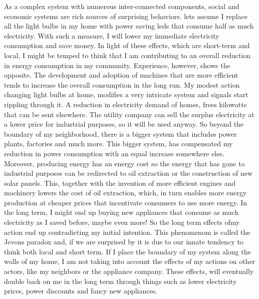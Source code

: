 \documentclass[12pt]{article}
\begin{document}
As a complex system with numerous inter-connected components, social and economic systems are  rich sources of surprising behaviors. lets assume I replace all the light bulbs in my home with power saving leds that consume half as much electricity. With such a measure, I will  lower my immediate electricity consumption and save money. In light of these effects, which are short-term and local, I might be temped to think that I am contributing to an overall reduction in energy consumption in my community. Experience, however, shows the opposite. The development and adoption of machines that are more efficient tends to increase the overall consumption in the long run. My modest action changing light bulbs at home, modifies a very intricate system and signals start rippling through it. A reduction in electricity demand of homes, frees kilowatts that can be sent elsewhere. The utility company can sell the surplus electricity at a lower price for industrial purposes, so it will be used anyway. So beyond the boundary of my neighborhood, there is a bigger system that includes power plants, factories and much more. This bigger system, has compensated my reduction in power consumption with an equal increase somewhere else. Moreover, producing energy has an energy cost so the energy that has gone to industrial purposes can be redirected to oil extraction or the construction of new solar panels. This, together with the invention of more efficient engines and machinery lowers the cost of oil extraction, which, in turn enables more energy production at cheaper prices that incentivate consumers to use more energy. In the long term, I might end up  buying new appliances that consume as much electricity as I saved before, maybe even more! So the long term effects ofmy action end up contradicting my initial intention. This phenomenom is called the Jevons paradox and, if we are surprised by it is due to our innate tendency to think both local and short term. If I place the boundary of my system along the walls of my home, I am not taking into account the effects of my actions on other actors, like my neighbors or the appliance company. These effects, will eventually double back on me in the long term through things such as lower electricity prices, power discounts and fancy new appliances.
\end{document}
